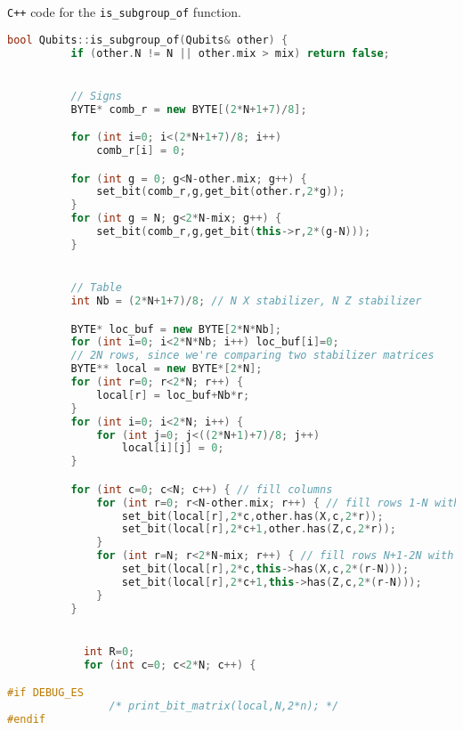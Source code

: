 \verb|C++| code for the \verb|is_subgroup_of| function.
\begin{lstlisting}[caption=\texttt{is\_subgroup\_of} function in the simulator,
label={lst:is-subgroup-of-cpp}, language=C++]
      bool Qubits::is_subgroup_of(Qubits& other) {
          if (other.N != N || other.mix > mix) return false;


          // Signs
          BYTE* comb_r = new BYTE[(2*N+1+7)/8];

          for (int i=0; i<(2*N+1+7)/8; i++)
              comb_r[i] = 0;

          for (int g = 0; g<N-other.mix; g++) {
              set_bit(comb_r,g,get_bit(other.r,2*g));
          }
          for (int g = N; g<2*N-mix; g++) {
              set_bit(comb_r,g,get_bit(this->r,2*(g-N)));
          }


          // Table
          int Nb = (2*N+1+7)/8; // N X stabilizer, N Z stabilizer

          BYTE* loc_buf = new BYTE[2*N*Nb];
          for (int i=0; i<2*N*Nb; i++) loc_buf[i]=0;
          // 2N rows, since we're comparing two stabilizer matrices
          BYTE** local = new BYTE*[2*N];
          for (int r=0; r<2*N; r++) {
              local[r] = loc_buf+Nb*r;
          }
          for (int i=0; i<2*N; i++) {
              for (int j=0; j<((2*N+1)+7)/8; j++)
                  local[i][j] = 0;
          }

          for (int c=0; c<N; c++) { // fill columns
              for (int r=0; r<N-other.mix; r++) { // fill rows 1-N with other
                  set_bit(local[r],2*c,other.has(X,c,2*r));
                  set_bit(local[r],2*c+1,other.has(Z,c,2*r));
              }
              for (int r=N; r<2*N-mix; r++) { // fill rows N+1-2N with this
                  set_bit(local[r],2*c,this->has(X,c,2*(r-N)));
                  set_bit(local[r],2*c+1,this->has(Z,c,2*(r-N)));
              }
          }


            int R=0;
            for (int c=0; c<2*N; c++) {

#if DEBUG_ES
                /* print_bit_matrix(local,N,2*n); */
#endif


\end{lstlisting}
